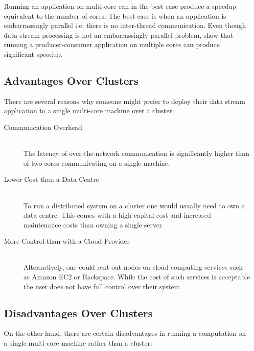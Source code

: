 Running an application on multi-core can in the best case produce a speedup equivalent to the number of cores. The best case is when an application is embarrassingly parallel i.e. there is no inter-thread communication. Even though data stream processing is not an embarrassingly parallel problem, \citet{Prat-Perez:2013:PPM:2450027.2450037} show that running a producer-consumer application on multiple cores can produce significant speedup.

\subsection{Advantages Over Clusters}

There are several reasons why someone might prefer to deploy their data stream application to a single multi-core machine over a cluster:

\begin{description}
	\item[Communication Overhead] \hfill \\
	The latency of over-the-network communication is significantly higher than of two cores communicating on a single machine.
	\item[Lower Cost than a Data Centre] \hfill \\
	To run a distributed system on a cluster one would usually need to own a data centre. This comes with a high capital cost and increased maintenance costs than owning a single server.
	\item[More Control than with a Cloud Provider] \hfill \\
	Alternatively, one could rent out nodes on cloud computing services such as Amazon EC2 or Rackspace. While the cost of such services is acceptable the user does not have full control over their system.
\end{description}

\subsection{Disadvantages Over Clusters}

On the other hand, there are certain disadvantages in running a computation on a single multi-core machine rather than a cluster:

